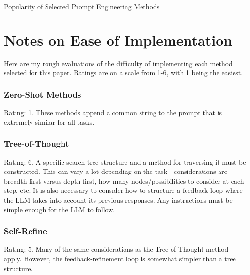 \documentclass[11pt]{article}
\begin{document}
\begin{landscape}

  \begin{centering}

    \begin{table}[h]
      \caption{Popularity of Selected Prompt Engineering Methods}
      \small
      
      \label{tab:method_pop}
    \end{table}

  \end{centering}

\end{landscape}

\section{Notes on Ease of Implementation}
\label{sec:difficulty}

Here are my rough evaluations of the difficulty of implementing each method selected for this paper. Ratings are on a scale from 1-6, with 1 being the easiest.

\subsubsection*{Zero-Shot Methods}

Rating: 1. These methods append a common string to the prompt that is extremely similar for all tasks.

\subsubsection*{Tree-of-Thought}

Rating: 6. A specific search tree structure and a method for traversing it must be constructed. This can vary a lot depending on the task - considerations are breadth-first versus depth-first, how many nodes/possibilities to consider at each step, etc. It is also necessary to consider how to structure a feedback loop where the LLM takes into account its previous responses. Any instructions must be simple enough for the LLM to follow.

\subsubsection*{Self-Refine}

Rating: 5. Many of the same considerations as the Tree-of-Thought method apply. However, the feedback-refinement loop is somewhat simpler than a tree structure.
\end{document}
